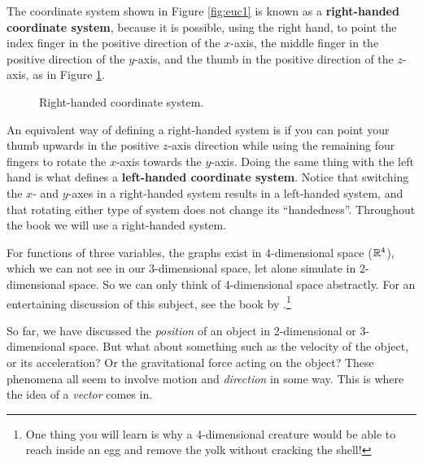 The coordinate system shown in Figure \ref{fig:euc1} is known as a
\textbf{right-handed coordinate system}, because
it is possible, using the right hand, to point the index finger in the positive direction of the $x$-axis,
the middle finger in the positive direction of the $y$-axis, and the thumb in the positive direction of the
$z$-axis, as in Figure \ref{fig:rhs}.

\begin{figure}[h]
 \begin{center}
  
 \end{center}
 \caption[]{\quad Right-handed coordinate system.}
 \label{fig:rhs}
\end{figure}

An equivalent way of defining a right-handed system is if you can point your thumb upwards in the positive
$z$-axis direction while using the remaining four fingers to rotate the $x$-axis towards the $y$-axis.
Doing the same thing
with the left hand is what defines a \textbf{left-handed coordinate system}.
Notice that switching the $x$- and $y$-axes
in a right-handed system results in a left-handed system, and that rotating either type of system does not change its ``handedness''.  
Throughout the book we will use a right-handed system.

For functions of three variables, the graphs exist in 4-dimensional space ($\mathbb{R}^{4}$),
which we can not see in our 3-dimensional space, let alone simulate in 2-dimensional space.  
So we can only think of 4-dimensional space abstractly.  For an entertaining discussion of this subject, see the book by
\cite{abb}.\footnote{One thing you will learn is why a 4-dimensional creature would be able to reach inside an egg and
remove the yolk without cracking the shell!}

So far, we have discussed the \emph{position} of an object in 2-dimensional or 3-dimensional space.
But what about something such as the velocity of the object, or its acceleration?
Or the gravitational force acting on the object? These phenomena all seem to involve motion and \emph{direction} in some
way.  This is where the idea of a \emph{vector} comes in.

